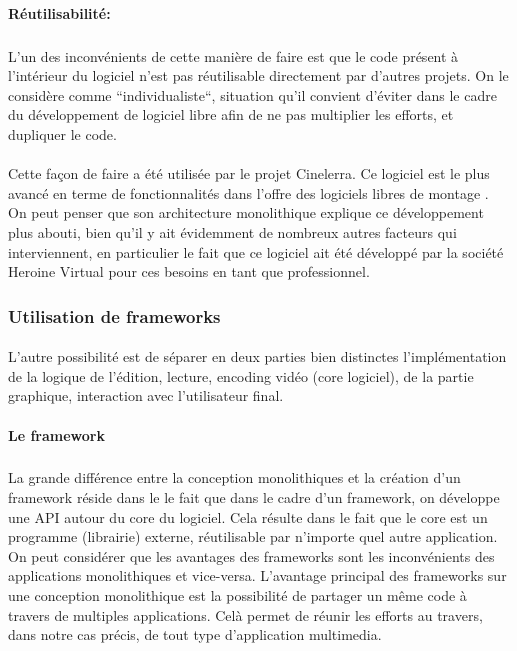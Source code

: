 \paragraph{Réutilisabilité:}

\subparagraph { }

L'un des inconvénients de cette manière de faire est que le code
présent
 à l'intérieur du logiciel n'est pas réutilisable directement
par d'autres projets. On le considère comme ``individualiste``, situation
qu'il convient d'éviter dans le cadre du développement de logiciel
libre afin de ne pas multiplier les efforts, et dupliquer le code.

\paragraph{}

Cette façon de faire a été utilisée par le projet Cinelerra. Ce
logiciel est le plus avancé en terme de fonctionnalités dans l'offre
des logiciels libres de montage . On peut penser que son architecture
monolithique explique ce développement plus
abouti, bien qu'il y ait évidemment de nombreux autres facteurs
qui interviennent, en particulier le fait que ce logiciel ait été
développé par la société Heroine Virtual pour ces besoins en tant
que professionnel.

\subsubsection {Utilisation de  frameworks }

\paragraph{}

L'autre possibilité est de séparer en deux parties bien distinctes
l'implémentation de la logique de l'édition, lecture, encoding vidéo
(core logiciel), de la partie graphique, interaction avec l'utilisateur
final.

\paragraph {Le framework}

\subparagraph{}

La grande différence entre la conception monolithiques
 et la création d'un framework 
réside dans le le fait que dans le cadre d'un framework, on développe
une API  autour du core du logiciel. Cela résulte dans le
fait que le core est un programme (librairie) externe, réutilisable par
n'importe quel autre application.  On peut considérer que les avantages
des frameworks sont les inconvénients des applications monolithiques
 et vice-versa. L'avantage principal des frameworks
sur une conception monolithique est la possibilité
de partager un même code à travers de multiples applications. Celà
permet de réunir les efforts au travers, dans notre cas précis, de
tout type d'application multimedia.

